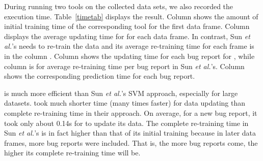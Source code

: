 
During running two tools on the collected data sets, we also recorded
the execution time. Table~\ref{timetab} displays the result. Column
 shows the amount of initial training time of
the corresponding tool for the first data frame. Column  displays the average updating time for {\model} for each data
frame. In contrast, Sun {\em et al.}'s needs to re-train the data and
its average re-training time for each frame is in the column
. Column  shows the
updating time for each bug report for {\model}, while column
 is for average re-training time per bug
report in Sun {\em et al.}'s. Column 
shows the corresponding prediction time for each bug report.

{\model} is much more efficient than Sun {\em et al.}'s SVM approach,
especially for large datasets. {\model} took much shorter time (many
times faster) for data updating than complete re-training time in
their approach. On average, for a new bug report, it took only about
0.14s for {\model} to update its data.
The complete re-training time in Sun {\em et al.}'s is in fact higher
than that of its initial training because in later data frames, more bug
reports were included. That is, the more bug reports come, the higher
its complete re-training time will be.


